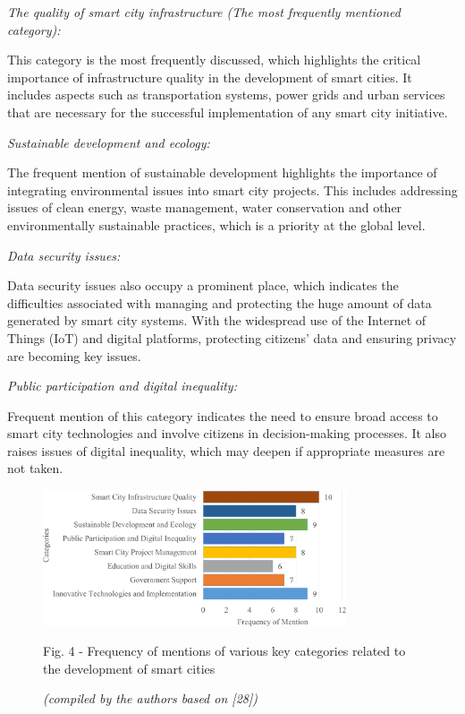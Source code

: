 \begin{multicols}{2}
\emph{The quality of smart city infrastructure (The most frequently
mentioned category):}

This category is the most frequently discussed, which highlights the
critical importance of infrastructure quality in the development of
smart cities. It includes aspects such as transportation systems, power
grids and urban services that are necessary for the successful
implementation of any smart city initiative.

\emph{Sustainable development and ecology:}

The frequent mention of sustainable development highlights the
importance of integrating environmental issues into smart city projects.
This includes addressing issues of clean energy, waste management, water
conservation and other environmentally sustainable practices, which is a
priority at the global level.

\emph{Data security issues:}

Data security issues also occupy a prominent place, which indicates the
difficulties associated with managing and protecting the huge amount of
data generated by smart city systems. With the widespread use of the
Internet of Things (IoT) and digital platforms, protecting
citizens'{} data and ensuring privacy are becoming key
issues.

\emph{Public participation and digital inequality:}

Frequent mention of this category indicates the need to ensure broad
access to smart city technologies and involve citizens in
decision-making processes. It also raises issues of digital inequality,
which may deepen if appropriate measures are not taken.
\end{multicols}

\begin{figure}[H]
	\centering
	\includegraphics[width=0.8\textwidth]{media/ekon/Graph_15}
	\caption*{Fig. 4 - Frequency of mentions of various key categories related to the development of smart cities}
	\caption*{\normalfont \emph{(compiled by the authors based on {[}28{]})}}
\end{figure}

